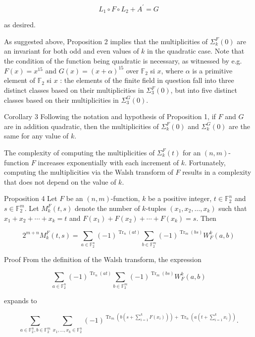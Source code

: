 \documentclass[10pt]{article}
\begin{document}
$$
L_{1} \circ F \circ L_{2}+A^{\prime}=G
$$

as desired.

As suggested above, Proposition 2 implies that the multiplicities of $\Sigma_{k}^{F}(0)$ are an invariant for both odd and even values of $k$ in the quadratic case. Note that the condition of the function being quadratic is necessary, as witnessed by e.g. $F(x)=x^{15}$ and $G(x)=(x+\alpha)^{15}$ over $\mathbb{F}_{2}$ si $x$, where $\alpha$ is a primitive element of $\mathbb{F}_{2}$ si $x$ : the elements of the finite field in question fall into three distinct classes based on their multiplicities in $\Sigma_{3}^{F}(0)$, but into five distinct classes based on their multiplicities in $\Sigma_{3}^{G}(0)$.

Corollary 3 Following the notation and hypothesis of Proposition 1, if $F$ and $G$ are in addition quadratic, then the multiplicities of $\Sigma_{k}^{F}(0)$ and $\Sigma_{k}^{G}(0)$ are the same for any value of $k$.

The complexity of computing the multiplicities of $\Sigma_{k}^{F}(t)$ for an $(n, m)$-function $F$ increases exponentially with each increment of $k$. Fortunately, computing the multiplicities via the Walsh transform of $F$ results in a complexity that does not depend on the value of $k$.

Proposition 4 Let $F$ be an $(n, m)$-function, $k$ be a positive integer, $t \in \mathbb{F}_{2}^{n}$ and $s \in \mathbb{F}_{2}^{m}$. Let $M_{k}^{F}(t, s)$ denote the number of $k$-tuples $\left(x_{1}, x_{2}, \ldots, x_{k}\right)$ such that $x_{1}+x_{2}+\cdots+x_{k}=t$ and $F\left(x_{1}\right)+F\left(x_{2}\right)+\cdots+F\left(x_{k}\right)=s$. Then


\begin{equation*}
2^{m+n} M_{k}^{F}(t, s)=\sum_{a \in \mathbb{F}_{2}^{n}}(-1)^{\operatorname{Tr}_{n}(a t)} \sum_{b \in \mathbb{F}_{2}^{m}}(-1)^{\operatorname{Tr}_{m}(b s)} W_{F}^{k}(a, b) \tag{2}
\end{equation*}


Proof From the definition of the Walsh transform, the expression

$$
\sum_{a \in \mathbb{F}_{2}^{n}}(-1)^{\operatorname{Tr}_{n}(a t)} \sum_{b \in \mathbb{F}_{2}^{m}}(-1)^{\operatorname{Tr}_{m}(b s)} W_{F}^{k}(a, b)
$$

expands to

$$
\sum_{a \in \mathbb{F}_{2}^{n}, b \in \mathbb{F}_{2}^{m}} \sum_{x_{1}, \ldots, x_{k} \in \mathbb{F}_{2}^{n}}(-1)^{\operatorname{Tr}_{m}\left(b\left(s+\sum_{i=1}^{k} F\left(x_{i}\right)\right)\right)+\operatorname{Tr}_{n}\left(a\left(t+\sum_{i=1}^{k} x_{i}\right)\right)} .
$$
\end{document}
